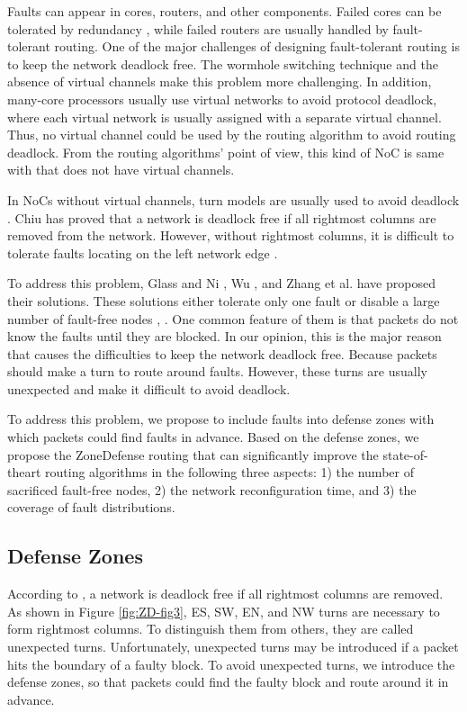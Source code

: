Faults can appear in cores, routers, and other components. Failed cores can be tolerated by redundancy \cite{zhang2009topology}, while failed routers are usually handled by fault-tolerant routing. One of the major challenges of designing fault-tolerant routing is to keep the network deadlock free. The wormhole switching technique and the absence of virtual channels make this problem more challenging. In addition, many-core processors usually use virtual networks to avoid protocol deadlock, where each virtual network is usually assigned with a separate virtual channel. Thus, no virtual channel could be used by the routing algorithm to avoid routing deadlock. From the routing algorithms’ point of view, this kind of NoC is same with that does not have virtual channels.

In NoCs without virtual channels, turn models are usually used to avoid deadlock \cite{glass1992turn} \cite{chiu2000odd} \cite{fu2011abacus}. Chiu \cite{chiu2000odd} has proved that a network is deadlock free if all rightmost columns are removed from the network. However, without rightmost columns, it is difficult to tolerate faults locating on the left network edge \cite{glass1993fault} \cite{wu2003fault} \cite{zhang2008reconfigurable}.

To address this problem, Glass and Ni \cite{glass1993fault}, Wu \cite{wu2003fault}, and Zhang et al. \cite{zhang2008reconfigurable} have proposed their solutions. These solutions either tolerate only one fault \cite{glass1993fault} or disable a large number of fault-free nodes \cite{wu2003fault}, \cite{zhang2008reconfigurable}. One common feature of them is that packets do not know the faults until they are blocked. In our opinion, this is the major reason that causes the difficulties to keep the network deadlock free. Because packets should make a turn to route around faults. However, these turns are usually unexpected and make it difficult to
avoid deadlock.

To address this problem, we propose to include faults into defense zones with which packets could find faults in advance. Based on the defense zones, we propose the ZoneDefense routing that can significantly improve the state-of-theart routing algorithms \cite{glass1993fault} \cite{wu2003fault} \cite{zhang2008reconfigurable}in the following three aspects: 1) the number of sacrificed fault-free nodes, 2) the network reconfiguration time, and 3) the coverage of fault distributions.

\subsection{Defense Zones}
According to \cite{chiu2000odd}, a network is deadlock free if all rightmost columns are removed. As shown in Figure \ref{fig:ZD-fig3}, ES, SW, EN, and NW turns are necessary to form rightmost columns. To distinguish them from others, they are called unexpected turns. Unfortunately, unexpected turns may be introduced if a packet hits the boundary of a faulty block. To avoid unexpected turns, we introduce the defense zones, so that packets could find the faulty block and route around it in advance.

